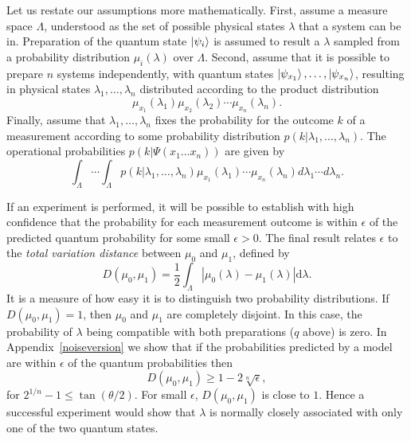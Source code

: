 \documentclass[amsmath,amssymb,superscriptaddress,twocolumn,pra]{revtex4-1}
\begin{document}
Let us restate our assumptions more mathematically. First, assume a measure space $\Lambda$, understood as the set of possible physical states $\lambda$ that a system can be in. Preparation of the quantum state $\ket{\psi_i}$ is assumed to result a $\lambda$ sampled from a probability distribution $\mu_i(\lambda)$ over $\Lambda$. Second, assume that it is possible to prepare $n$ systems independently, with quantum states $\ket{\psi_{x_1}}, \dotsc, \ket{\psi_{x_n}}$, resulting in physical states $\lambda_1, \dotsc, \lambda_n$ distributed according to the product distribution
\begin{equation}
 \mu_{x_1}(\lambda_1)\mu_{x_2}(\lambda_2)\dotsm\mu_{x_n}(\lambda_n).
\end{equation}
Finally, assume that $\lambda_1, \dotsc, \lambda_n$ fixes the probability for the outcome $k$ of a measurement according to some probability distribution $p(k|\lambda_1, \dotsc, \lambda_n)$. The operational probabilities $p\left( k|\Psi(x_1\ldots x_n)\right)$  are given by
\begin{equation}
  \int_\Lambda \dotsm \int_\Lambda p(k|\lambda_1, \dotsc, \lambda_n)\mu_{x_1}(\lambda_1)\dotsm \mu_{x_n}(\lambda_n) d\lambda_1 \dotsm d\lambda_n.
\end{equation}

If an experiment is performed, it will be possible to establish with high confidence that the probability for each measurement outcome is within $\epsilon$ of the predicted quantum probability for some small $\epsilon > 0$. The final result relates $\epsilon$ to the \emph{total variation distance} \cite{probmet} between $\mu_0$ and $\mu_1$, defined by
\begin{equation}
D(\mu_0,\mu_1) = \frac12\int_{\Lambda} |\mu_0(\lambda) - \mu_1(\lambda)| \mathrm{d}\lambda.
\end{equation}
It is a measure of how easy it is to distinguish two probability distributions. If $D(\mu_0,\mu_1)=1$, then $\mu_0$ and $\mu_1$ are completely disjoint. In this case, the probability of $\lambda$ being compatible with both preparations ($q$ above) is zero. In Appendix~\ref{noiseversion} we show that if the probabilities predicted by a model are within $\epsilon$ of the quantum probabilities then
\begin{equation}
D(\mu_0,\mu_1) \geq 1 - 2\sqrt[n]{\epsilon},
\label{finalresult}
\end{equation}
for $2^{1/n} - 1 \leq \tan (\theta/2)$.
For small $\epsilon$, $D(\mu_0,\mu_1)$ is close to $1$. Hence a successful experiment would show that $\lambda$ is normally closely associated with only one of the two quantum states.
\end{document}
